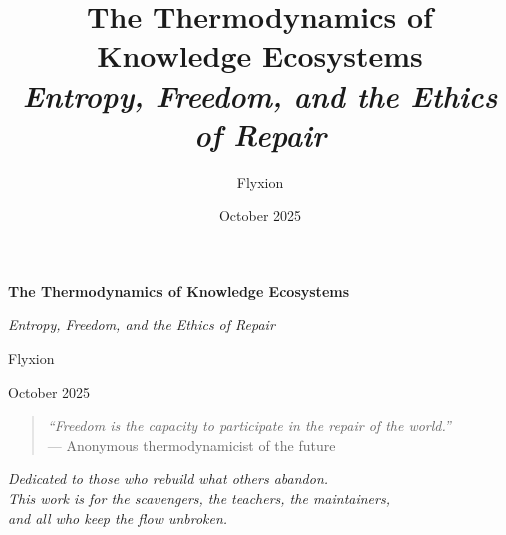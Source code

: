 \documentclass[11pt,a4paper,titlepage]{article}
\title{\Huge\bfseries The Thermodynamics of Knowledge Ecosystems\\
       \vspace{0.5em}\large\itshape Entropy, Freedom, and the Ethics of Repair}
\author{Flyxion}
\date{October 2025}
\theoremstyle{definition}
\begin{document}
\begin{titlepage}
\centering
\vspace*{2cm}
{\Huge\bfseries The Thermodynamics of Knowledge Ecosystems\par}
\vspace{0.5em}
{\Large\itshape Entropy, Freedom, and the Ethics of Repair\par}
\vspace{2.5cm}
{\Large Flyxion\par}
\vspace{0.5em}
{\large October 2025\par}
\vfill
\begin{quote}
\small
\textit{“Freedom is the capacity to participate in the repair of the world.”}\\[0.4em]
— Anonymous thermodynamicist of the future
\end{quote}
\vspace{2cm}
\begin{flushright}
\textit{Dedicated to those who rebuild what others abandon.}\\
\textit{This work is for the scavengers, the teachers, the maintainers,}\\
\textit{and all who keep the flow unbroken.}
\end{flushright}
\vspace*{1cm}
\end{titlepage}

\clearpage
\thispagestyle{empty}
\mbox{}
\newpage
\end{document}
